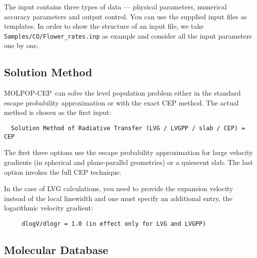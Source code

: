 \documentclass[12pt]{article}
\def\separation {0.5cm}
\def\M{MOLPOP-CEP}
\begin{document}
The input contains three types of data --- physical parameters, numerical
accuracy parameters and output control.  You can use the supplied input files
as templates. In order to show the structure of an input file, we take
\texttt{Samples/CO/Flower\_rates.inp} as example and consider all the input
parameters one by one.

\subsection{Solution Method}

\M\ can solve the level population problem either in the standard escape
probability approximation or with the exact CEP method. The actual method is
chosen as the first input:

\vspace{\separation}
\begin{verbatim}
  Solution Method of Radiative Transfer (LVG / LVGPP / slab / CEP) = CEP
\end{verbatim}
The first three options use the escape probability approximation for large
velocity gradients (in spherical and plane-parallel geometries) or a quiescent slab. 
The last option invokes the full CEP
technique. 


In the case of LVG calculations, you need to provide the expansion velocity
instead of the local linewidth and one must specify an additional entry, the
logarithmic velocity gradient:
%
\smallskip
\begin{verbatim}
     dlogV/dlogr = 1.0 (in effect only for LVG and LVGPP)
\end{verbatim}


\subsection{Molecular Database}
\end{document}
